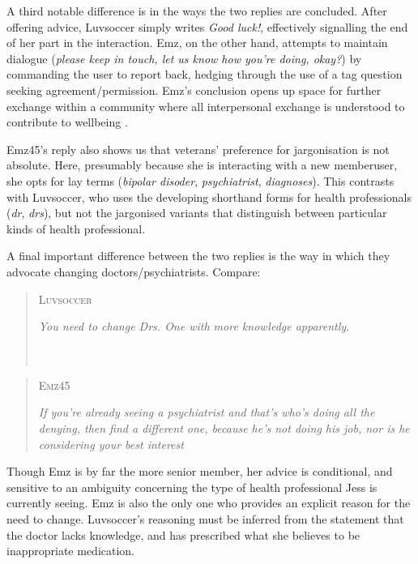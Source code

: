 \documentclass{article}
\begin{document}
{A third notable difference is in the ways the two replies are concluded. After offering advice, Luvsoccer simply writes \emph{Good luck!}, effectively signalling the end of her part in the interaction. Emz, on the other hand, attempts to maintain dialogue (\emph{please keep in touch, let us know how you're doing, okay?}) by commanding the user to report back, hedging through the use of a tag question seeking agreement\slash permission. Emz's conclusion opens up space for further exchange within a community where all interpersonal exchange is understood to contribute to wellbeing \parencite[c.f.][]{althoff_counseling_2016}.%

Emz45's reply also shows us that veterans' preference for jargonisation is not absolute. Here, presumably because she is interacting with a new member{user}, she opts for lay terms (\emph{bipolar disoder}, \emph{psychiatrist}, \emph{diagnoses}). This contrasts with Luvsoccer, who uses the developing shorthand forms for health professionals (\emph{dr}, \emph{drs}), but not the jargonised variants that distinguish between particular kinds of health professional.

A final important difference between the two replies is the way in which they advocate changing doctors\slash psychiatrists. Compare:

\begin{multicols}{2}
\begin{quote}
\textsc{Luvsoccer}

\emph{You need to change Drs. One with more knowledge apparently.} ~\\~\\~\\
\end{quote}

\begin{quote}
\textsc{Emz45}

\emph{If you're already seeing a psychiatrist and that's who's doing all the denying, then find a different one, because he's not doing his job, nor is he considering your best interest}
\end{quote}
\end{multicols}
%
\noindent Though Emz is by far the more senior member, her advice is conditional, and sensitive to an ambiguity concerning the type of health professional Jess is currently seeing. Emz is also the only one who provides an explicit reason for the need to change. Luvsoccer's reasoning must be inferred from the statement that the doctor lacks knowledge, and has prescribed what she believes to be inappropriate medication. 

}
\end{document}
